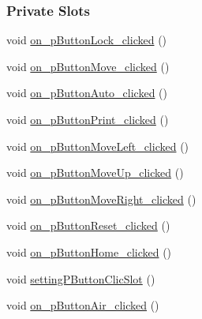 \subsubsection*{Private Slots}
\begin{DoxyCompactItemize}
\item 
void \mbox{\hyperlink{classIndexerWidget_a5700a9df0a8d83253d5b4c1a7908a3f0}{on\+\_\+p\+Button\+Lock\+\_\+clicked}} ()
\item 
void \mbox{\hyperlink{classIndexerWidget_ace858fa20587dd1cf2822b278f8baf95}{on\+\_\+p\+Button\+Move\+\_\+clicked}} ()
\item 
void \mbox{\hyperlink{classIndexerWidget_a32ceafc2476b8822b1865a39ea5f4aa3}{on\+\_\+p\+Button\+Auto\+\_\+clicked}} ()
\item 
void \mbox{\hyperlink{classIndexerWidget_a556d0a3c344dc91460458f8958423991}{on\+\_\+p\+Button\+Print\+\_\+clicked}} ()
\item 
void \mbox{\hyperlink{classIndexerWidget_ab6e2ace22ecd642d1090c103467d51fa}{on\+\_\+p\+Button\+Move\+Left\+\_\+clicked}} ()
\item 
void \mbox{\hyperlink{classIndexerWidget_a5391681e2ddcad15da823c41f21974fc}{on\+\_\+p\+Button\+Move\+Up\+\_\+clicked}} ()
\item 
void \mbox{\hyperlink{classIndexerWidget_a9b3217e574ec1791e91a38c6ddddad35}{on\+\_\+p\+Button\+Move\+Right\+\_\+clicked}} ()
\item 
void \mbox{\hyperlink{classIndexerWidget_ac4ccc271795ea968fa3c2c173ac2898e}{on\+\_\+p\+Button\+Reset\+\_\+clicked}} ()
\item 
void \mbox{\hyperlink{classIndexerWidget_a4d375a44ccc6c5d096667940e5e6fe10}{on\+\_\+p\+Button\+Home\+\_\+clicked}} ()
\item 
void \mbox{\hyperlink{classIndexerWidget_a4621d1eb9163b44c7d5343551e8bb225}{setting\+P\+Button\+Clic\+Slot}} ()
\item 
void \mbox{\hyperlink{classIndexerWidget_a5c46c6c40102a7f753028a0b4d5ae57c}{on\+\_\+p\+Button\+Air\+\_\+clicked}} ()
\end{DoxyCompactItemize}
